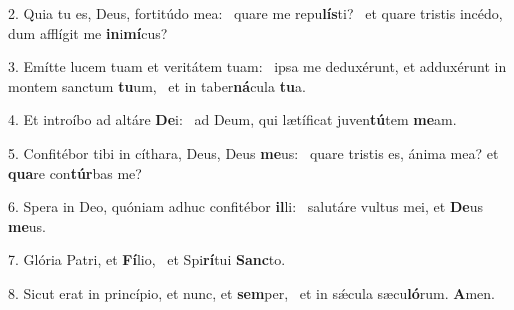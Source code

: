 2. Quia tu es, Deus, fortitúdo mea: \dag\  quare me repu\textbf{lís}ti? \ast\  et quare tristis incédo, dum afflígit me \textbf{in}i\textbf{mí}cus?\

3. Emítte lucem tuam et veritátem tuam: \dag\  ipsa me deduxérunt, et adduxérunt in montem sanctum \textbf{tu}um, \ast\  et in taber\textbf{ná}cula \textbf{tu}a.\

4. Et introíbo ad altáre \textbf{De}i: \ast\  ad Deum, qui lætíficat juven\textbf{tú}tem \textbf{me}am.\

5. Confitébor tibi in cíthara, Deus, Deus \textbf{me}us: \ast\  quare tristis es, ánima mea? et \textbf{qua}re con\textbf{túr}bas me?\

6. Spera in Deo, quóniam adhuc confitébor \textbf{il}li: \ast\  salutáre vultus mei, et \textbf{De}us \textbf{me}us.\

7. Glória Patri, et \textbf{Fí}lio, \ast\  et Spi\textbf{rí}tui \textbf{Sanc}to.\

8. Sicut erat in princípio, et nunc, et \textbf{sem}per, \ast\  et in sǽcula sæcu\textbf{ló}rum. \textbf{A}men.\

